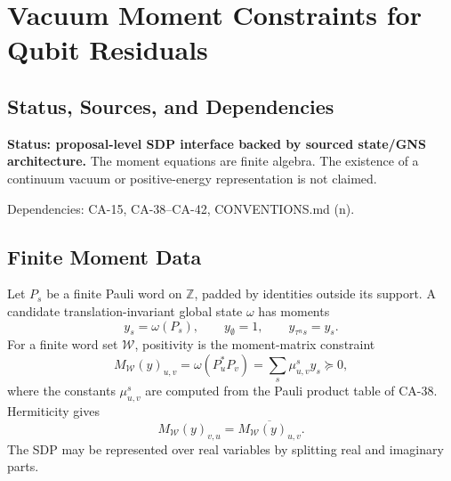 
\section{Vacuum Moment Constraints for Qubit Residuals}
\label{sec:qubit-vacuum-moment-constraints}

\subsection{Status, Sources, and Dependencies}

\textbf{Status: proposal-level SDP interface backed by sourced state/GNS
architecture.}  The moment equations are finite algebra.  The existence of a
continuum vacuum or positive-energy representation is not claimed.

Dependencies: CA-15, CA-38--CA-42, CONVENTIONS.md (n).


\subsection{Finite Moment Data}

Let \(P_s\) be a finite Pauli word on \(\mathbb Z\), padded by identities
outside its support.  A candidate translation-invariant global state \(\omega\)
has moments
\[
  y_s=\omega(P_s),
  \qquad y_{\emptyset}=1,
  \qquad y_{\tau^n s}=y_s.
  \tag{43.1}
\]
For a finite word set \(\mathcal W\), positivity is the moment-matrix
constraint
\[
  M_{\mathcal W}(y)_{u,v}
  =
  \omega(P_u^*P_v)
  =
  \sum_s \mu_{u,v}^{s}y_s
  \succeq0,
  \tag{43.2}
\]
where the constants \(\mu_{u,v}^{s}\) are computed from the Pauli product
table of CA-38.  Hermiticity gives
\[
  M_{\mathcal W}(y)_{v,u}
  =
  \overline{M_{\mathcal W}(y)_{u,v}}.
\]
The SDP may be represented over real variables by splitting real and imaginary
parts.

